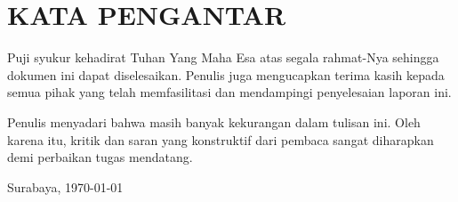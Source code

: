 \chapter*{KATA PENGANTAR}

Puji syukur kehadirat Tuhan Yang Maha Esa atas segala rahmat-Nya sehingga dokumen ini dapat diselesaikan. Penulis juga mengucapkan terima kasih kepada semua pihak yang telah memfasilitasi dan mendampingi penyelesaian laporan ini.

Penulis menyadari bahwa masih banyak kekurangan dalam tulisan ini. Oleh karena itu, kritik dan saran yang konstruktif dari pembaca sangat diharapkan demi perbaikan tugas mendatang.

\vspace{2cm}
\begin{flushright}
  Surabaya, \today \\[1.5cm]
  \studentname
\end{flushright}
